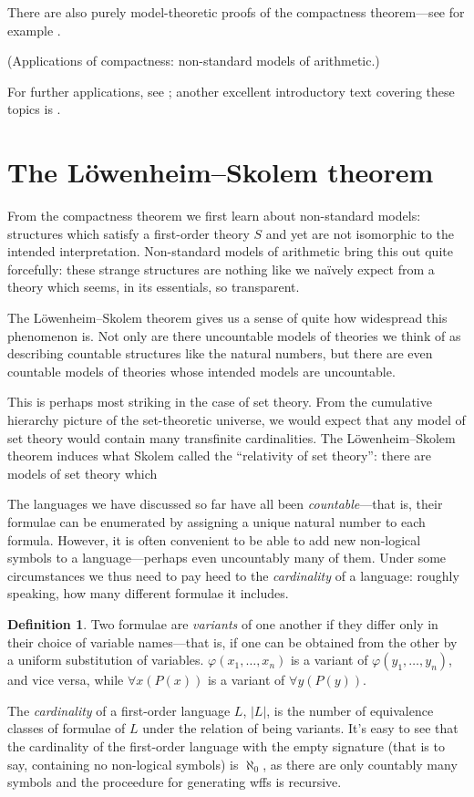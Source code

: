 \documentclass[10pt, a4paper, oneside]{article}
\theoremstyle{definition}
\newtheorem{dfn}[thm]{Definition}
\theoremstyle{remark}
\theoremstyle{plain}
\begin{document}
There are also purely model-theoretic proofs of the compactness theorem---see
for example \citet[pp. 125--127]{hodges1997}.

(Applications of compactness: non-standard models of arithmetic.)

For further applications, see \citet{vdalen2004}; another excellent introductory
text covering these topics is \citet{kaye2007}.


\section{The Löwenheim--Skolem theorem}

From the compactness theorem we first learn about non-standard models:
structures which satisfy a first-order theory $S$ and yet are not isomorphic to
the intended interpretation. Non-standard models of arithmetic bring this out
quite forcefully: these strange structures are nothing like we naïvely expect
from a theory which seems, in its essentials, so transparent.

The Löwenheim--Skolem theorem gives us a sense of quite how widespread this
phenomenon is. Not only are there uncountable models of theories we think of as
describing countable structures like the natural numbers, but there are even
countable models of theories whose intended models are uncountable.

This is perhaps most striking in the case of set theory. From the cumulative
hierarchy picture of the set-theoretic universe, we would expect that any model
of set theory would contain many transfinite cardinalities. The
Löwenheim--Skolem theorem induces what Skolem called the ``relativity of set
theory'': there are models of set theory which

The languages we have discussed so far have all been \emph{countable}---that is,
their formulae can be enumerated by assigning a unique natural number to each
formula. However, it is often convenient to be able to add new non-logical
symbols to a language---perhaps even uncountably many of them. Under some
circumstances we thus need to pay heed to the \emph{cardinality} of a language:
roughly speaking, how many different formulae it includes.

\begin{dfn}
    Two formulae are \emph{variants} of one another if they differ only in their
    choice of variable names---that is, if one can be obtained from the other by
    a uniform substitution of variables. $\varphi(x_1, \dotsc, x_n)$ is a
    variant of $\varphi(y_1, \dotsc, y_n)$, and vice versa, while
    $\forall{x} (P(x))$ is a variant of $\forall{y} (P(y))$.
    
    The \emph{cardinality} of a first-order language $L$, $|L|$, is the number
    of equivalence classes of formulae of $L$ under the relation of being
    variants. It's easy to see that the cardinality of the first-order language
    with the empty signature (that is to say, containing no non-logical symbols)
    is $\aleph_0$, as there are only countably many symbols and the proceedure
    for generating wffs is recursive.
\end{dfn}
\end{document}
